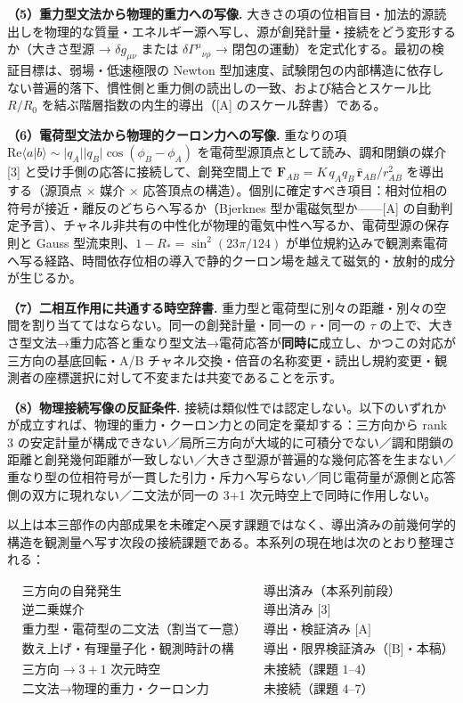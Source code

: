 \documentclass[
  a4paper,
]{ltjsarticle}
\begin{document}
\textbf{（5）重力型文法から物理的重力への写像.}
大きさの項の位相盲目・加法的源読出しを物理的な質量・エネルギー源へ写し、源が創発計量・接続をどう変形するか（大きさ型源
→ \(\delta g_{\mu\nu}\) または \(\delta\Gamma^\mu{}_{\nu\rho}\) →
閉包の運動）を定式化する。最初の検証目標は、弱場・低速極限の Newton
型加速度、試験閉包の内部構造に依存しない普遍的落下、慣性側と重力側の読出しの一致、および結合とスケール比
\(R/R_0\) を結ぶ階層指数の内生的導出（{[}A{]} のスケール辞書）である。

\textbf{（6）電荷型文法から物理的クーロン力への写像.} 重なりの項
\(\mathrm{Re}\langle a|b\rangle\sim|q_A||q_B|\cos(\phi_B-\phi_A)\)
を電荷型源頂点として読み、調和閉鎖の媒介 {[}3{]}
と受け手側の応答に接続して、創発空間上で
\(\mathbf F_{AB}=K\,q_Aq_B\,\hat{\mathbf r}_{AB}/r_{AB}^2\)
を導出する（源頂点 × 媒介 ×
応答頂点の構造）。個別に確定すべき項目：相対位相の符号が接近・離反のどちらへ写るか（Bjerknes
型か電磁気型か------{[}A{]}
の自動判定予言）、チャネル非共有の中性化が物理的電気中性へ写るか、電荷型源の保存則と
Gauss 型流束則、\(1-R_\ast=\sin^2(23\pi/124)\)
が単位規約込みで観測素電荷へ写る経路、時間依存位相の導入で静的クーロン場を越えて磁気的・放射的成分が生じるか。

\textbf{（7）二相互作用に共通する時空辞書.}
重力型と電荷型に別々の距離・別々の空間を割り当ててはならない。同一の創発計量・同一の
\(r\)・同一の \(\tau\)
の上で、大きさ型文法→重力応答と重なり型文法→電荷応答が\textbf{同時に}成立し、かつこの対応が三方向の基底回転・A/B
チャネル交換・倍音の名称変更・読出し規約変更・観測者の座標選択に対して不変または共変であることを示す。

\textbf{（8）物理接続写像の反証条件.}
接続は類似性では認定しない。以下のいずれかが成立すれば、物理的重力・クーロン力との同定を棄却する：三方向から
rank 3
の安定計量が構成できない／局所三方向が大域的に可積分でない／調和閉鎖の距離と創発幾何距離が一致しない／大きさ型源が普遍的な幾何応答を生まない／重なり型の位相符号が一貫した引力・斥力へ写らない／同じ電荷量が源側と応答側の双方に現れない／二文法が同一の
3+1 次元時空上で同時に作用しない。

以上は本三部作の内部成果を未確定へ戻す課題ではなく、導出済みの前幾何学的構造を観測量へ写す次段の接続課題である。本系列の現在地は次のとおり整理される：

\[
\boxed{
\begin{aligned}
&\text{三方向の自発発生} && \text{導出済み（本系列前段）}\\
&\text{逆二乗媒介} && \text{導出済み [3]}\\
&\text{重力型・電荷型の二文法（割当て一意）} && \text{導出・検証済み [A]}\\
&\text{数え上げ・有理量子化・観測時計の構造} && \text{導出・限界検証済み（[B]・本稿）}\\
&\text{三方向}\to 3+1\text{ 次元時空} && \text{未接続（課題 1–4）}\\
&\text{二文法}\to\text{物理的重力・クーロン力} && \text{未接続（課題 4–7）}
\end{aligned}
}
\]
\end{document}
